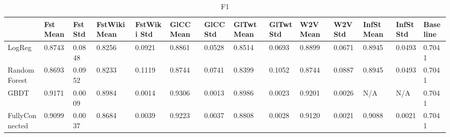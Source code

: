 \documentclass[unicode, 12pt, a4paper,oneside]{article}
\begin{document}
\begin{table}[]
\centering
\caption{F1}
\label{f11}
\begin{adjustbox}{width=\textwidth}
\begin{tabular}{@{}|l|lllllllllllll@{}}
\multicolumn{1}{l|}{}                      & \multicolumn{1}{l|}{Fst Mean} & \multicolumn{1}{l|}{Fst Std} & \multicolumn{1}{l|}{FstWiki Mean} & \multicolumn{1}{l|}{FstWiki Std} & \multicolumn{1}{l|}{GlCC Mean} & \multicolumn{1}{l|}{GlCC Std} & \multicolumn{1}{l|}{GlTwt Mean} & \multicolumn{1}{l|}{GlTwt Std} & \multicolumn{1}{l|}{W2V Mean} & \multicolumn{1}{l|}{W2V Std} & \multicolumn{1}{l|}{InfSt Mean} & \multicolumn{1}{l|}{InfSt Std} & \multicolumn{1}{l|}{Baseline} \\ \midrule
LogReg        & 0.8743                        & 0.0848                       & 0.8256                            & 0.0921                           & 0.8861                         & 0.0528                        & 0.8514                          & 0.0693                         & 0.8899                        & 0.0671                       & 0.8945                          & 0.0493                         & 0.7041                        \\ \cmidrule(r){1-1}
Random Forest   & 0.8693                        & 0.0952                       & 0.8233                            & 0.1119                           & 0.8744                         & 0.0741                        & 0.8399                          & 0.1052                         & 0.8744                        & 0.0887                       & 0.8945                          & 0.0493                         & 0.7041                        \\ \cmidrule(r){1-1}
GBDT       & 0.9171                        & 0.0009                       & 0.8984                            & 0.0014                           & 0.9306                         & 0.0013                        & 0.8986                          & 0.0023                         & 0.9201                        & 0.0026                       & N/A                             & N/A                            & 0.7041                        \\ \cmidrule(r){1-1}
FullyConnected & 0.9099                        & 0.0037                       & 0.8684                            & 0.0039                           & 0.9223                         & 0.0037                        & 0.8808                          & 0.0028                         & 0.9120                        & 0.0021                       & 0.9088                          & 0.0021                         & 0.7041                        \\ 

\end{tabular}
\end{adjustbox}
\end{table}
\end{document}
